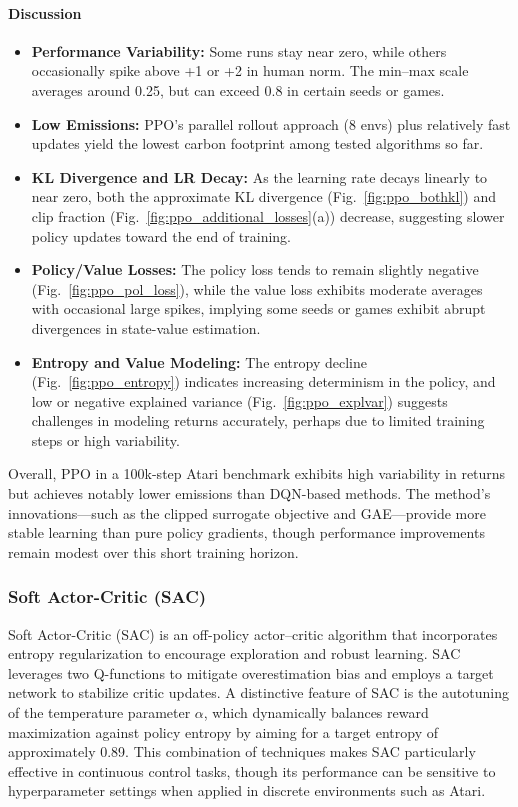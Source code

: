 \paragraph{Discussion}
\begin{itemize}
	\item \textbf{Performance Variability:} 
	Some runs stay near zero, while others occasionally spike above +1 or +2 in human norm. 
	The min--max scale averages around 0.25, but can exceed 0.8 in certain seeds or games.
	\item \textbf{Low Emissions:} 
	PPO’s parallel rollout approach (8 envs) plus relatively fast updates 
	yield the lowest carbon footprint among tested algorithms so far.
	\item \textbf{KL Divergence and LR Decay:} As the learning rate decays linearly to near zero, both the approximate KL divergence (Fig.~\ref{fig:ppo_bothkl}) and clip fraction (Fig.~\ref{fig:ppo_additional_losses}(a)) decrease, suggesting slower policy updates toward the end of training.
	\item \textbf{Policy/Value Losses:} The policy loss tends to remain slightly negative (Fig.~\ref{fig:ppo_pol_loss}), while the value loss exhibits moderate averages with occasional large spikes, implying some seeds or games exhibit abrupt divergences in state-value estimation.
	\item \textbf{Entropy and Value Modeling:} The entropy decline (Fig.~\ref{fig:ppo_entropy}) indicates increasing determinism in the policy, and low or negative explained variance (Fig.~\ref{fig:ppo_explvar}) suggests challenges in modeling returns accurately, perhaps due to limited training steps or high variability.
\end{itemize}

Overall, PPO in a 100k-step Atari benchmark exhibits high variability in returns but achieves notably lower emissions than DQN-based methods. The method’s innovations—such as the clipped surrogate objective and GAE—provide more stable learning than pure policy gradients, though performance improvements remain modest over this short training horizon.

\subsubsection{Soft Actor-Critic (SAC)}
\label{subsubsec:sac}

Soft Actor-Critic (SAC) is an off-policy actor–critic algorithm that incorporates entropy regularization to encourage exploration and robust learning. SAC leverages two Q-functions to mitigate overestimation bias and employs a target network to stabilize critic updates. A distinctive feature of SAC is the autotuning of the temperature parameter $\alpha$, which dynamically balances reward maximization against policy entropy by aiming for a target entropy of approximately 0.89. This combination of techniques makes SAC particularly effective in continuous control tasks, though its performance can be sensitive to hyperparameter settings when applied in discrete environments such as Atari.

